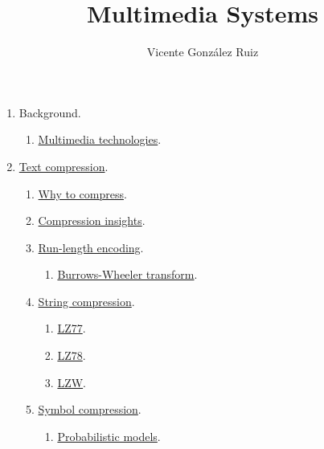 
\title{Multimedia Systems}
\author{Vicente González Ruiz}

\maketitle

\begin{enumerate}
\item Background.
  \begin{enumerate}
  \item \href{https://tecnologias-multimedia.github.io}{Multimedia technologies}.
  \end{enumerate}
  
\item \href{https://vicente-gonzalez-ruiz.github.io/text_compression/}{Text compression}.
  \begin{enumerate}
  \item \href{https://vicente-gonzalez-ruiz.github.io/why_to_compress/}{Why to compress}.
  \item \href{https://vicente-gonzalez-ruiz.github.io/compression_insights/}{Compression insights}.
  \item \href{https://vicente-gonzalez-ruiz.github.io/run-length_encoding/}{Run-length encoding}.
  \begin{enumerate}
  \item \href{https://vicente-gonzalez-ruiz.github.io/Burrows-Wheeler_transform/}{Burrows-Wheeler transform}.
  \end{enumerate}
\item \href{https://vicente-gonzalez-ruiz.github.io/string_compression/}{String compression}.
  \begin{enumerate}
  \item \href{https://vicente-gonzalez-ruiz.github.io/LZ77/}{LZ77}.
  \item \href{https://vicente-gonzalez-ruiz.github.io/LZ78/}{LZ78}.
  \item \href{https://vicente-gonzalez-ruiz.github.io/LZW/}{LZW}.
  \end{enumerate}
\item \href{https://vicente-gonzalez-ruiz.github.io/symbol_compression/}{Symbol compression}.
  \begin{enumerate}
  \item \href{https://vicente-gonzalez-ruiz.github.io/probabilistic_models/}{Probabilistic models}.

\end{enumerate}
\end{enumerate}
\end{enumerate}
